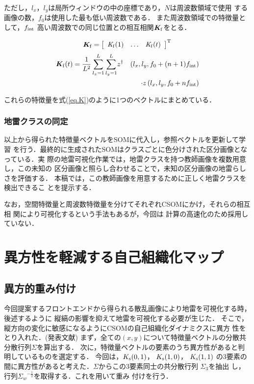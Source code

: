 ﻿\documentclass[12pt,oneside]{jsbook}
\begin{document}
ただし，$l_x，l_y$は局所ウィンドウの中の座標であり，$N$は周波数領域で使用
する画像の数，$f_0$は使用した最も低い周波数である．
 また周波数領域での特徴量として，$f_{\rm int}$
 高い周波数での同じ位置との相互相関${\bm K_{{\rm f}}}$をとる．

 \begin{eqnarray}
  {\bm K_{{\rm f}}} = \left[\begin{array}{ccc}
                      {\it K_{{\rm f}}}(1) & \ldots & {\it K_{{\rm f}}}(t)
                            \end{array} \right]^{\mathrm{T}}
 \end{eqnarray}
 \begin{eqnarray}
{\bm K_{{\rm f}}}(t) = \frac{1}{L^2}\sum_{l_x = 1}^{L}\sum_{l_y =
 1}^{L}&z^{\dagger}&\left(l_x, l_y, f_0+(n+1)f_{{\rm int}}\right)
 \nonumber\\&&\hspace{0em}\cdot
 z\left(l_x, l_y, f_0+nf_{{\rm int}}\right)
\end{eqnarray}

これらの特徴量を式(\ref{eq.K})のように1つのベクトルにまとめている．

\subsection{地雷クラスの同定}
以上から得られた特徴量ベクトルをSOMに代入し，参照ベクトルを更新して学習
を行う．最終的に生成されたSOMはクラスごとに色分けされた区分画像となっている．実
際の地雷可視化作業では，地雷クラスを持つ教師画像を複数用意し，この未知の
区分画像と照らし合わせることで，未知の区分画像の地雷らしさを評価する\cite{2010Nakano}．
本稿では，この教師画像を用意するために正しく地雷クラスを検出できるこ
とを提示する．

なお，空間特徴量と周波数特徴量を分けてそれぞれCSOMにかけ，それらの相互相
 関により可視化するという手法もある\cite{ejiri}が，今回は
計算の高速化のため採用していない．
\newpage
\chapter{異方性を軽減する自己組織化マップ}
\section{異方的重み付け}
今回提案するフロントエンドから得られる散乱画像により地雷を可視化する時，
後述するように
縦縞の影響を抑えて地雷を可視化する必要が生じた．
そこで，縦方向の変化に敏感になるようにCSOMの自己組織化ダイナミクスに異方
性をとり入れた．(発表文献\cite{koyama})
まず，全ての$(x,y)$について特徴量ベクトルの分散共分散行列$\Sigma$を算出する．
次に，特徴量ベクトルの要素のうち異方性があると判明しているものを選定する．
今回は，$K_{{\rm s}}(0,1)$，
$K_{{\rm s}}(1,0)$，
$K_{{\rm s}}(1,1)$
の3要素の間に異方性があると考えた．$\Sigma$からこの3要素同士の共分散行列
$\Sigma_3$を抽出
し，行列${\Sigma_w}^{-\frac{1}{2}}$を取得する．これを用いて重み
付けを行う．
\end{document}
